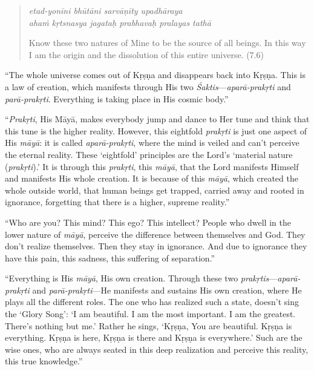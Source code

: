 \documentclass[12pt, twoside, openright]{memoir}
\begin{document}
\par
\begin{verse}
\textit{etad-yonīni bhūtāni sarvāṇīty upadhāraya} \\
\textit{ahaṁ kṛtsnasya jagataḥ prabhavaḥ pralayas tathā}

\noindent Know these two natures of Mine to be the source of all beings. In this way I am the origin and the dissolution of this entire universe. (7.6)
\end{verse}
\par


\enquote{The whole universe comes out of Kṛṣṇa and disappears back into Kṛṣṇa. This is a law of creation, which manifests through His two \textit{Śaktis}---\textit{aparā-prakṛti} and \textit{parā-prakṛti}. Everything is taking place in His cosmic body.}

\enquote{\textit{Prakṛti}, His Māyā, makes everybody jump and dance to Her tune and think that this tune is the higher reality. However, this eightfold \textit{prakṛti} is just one aspect of His \textit{māyā}: it is called \textit{aparā-prakṛti}, where the mind is veiled and can’t perceive the eternal reality. These \enquote{eightfold} principles are the Lord’s \enquote{material nature (\textit{prakṛti}).} It is through this \textit{prakṛti}, this \textit{māyā}, that the Lord manifests Himself and manifests His whole creation. It is because of this \textit{māyā}, which created the whole outside world, that human beings get trapped, carried away and rooted in ignorance, forgetting that there is a higher, supreme reality.}

\enquote{Who are you? This mind? This ego? This intellect? People who dwell in the lower nature of \textit{māyā}, perceive the difference between themselves and God. They don’t realize themselves. Then they stay in ignorance. And due to ignorance they have this pain, this sadness, this suffering of separation.}

\enquote{Everything is His \textit{māyā}, His own creation. Through these two \textit{prakṛtis}---\textit{aparā-prakṛti} and \textit{parā-prakṛti}---He manifests and sustains His own creation, where He plays all the different roles. The one who has realized such a state, doesn’t sing the \enquote{Glory Song}: \enquote{I am beautiful. I am the most important. I am the greatest. There’s nothing but me.} Rather he sings, \enquote{Kṛṣṇa, You are beautiful. Kṛṣṇa is everything. Kṛṣṇa is here, Kṛṣṇa is there and Kṛṣṇa is everywhere.} Such are the wise ones, who are always seated in this deep realization and perceive this reality, this true knowledge.}
\end{document}
